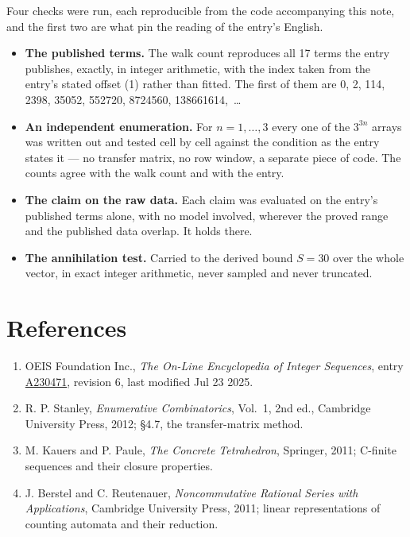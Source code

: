 \documentclass[11pt]{article}
\theoremstyle{definition}
\begin{document}
Four checks were run, each reproducible from the code accompanying this note, and the first two are what pin the reading of the entry's English.

\begin{itemize}

\item {\bfseries The published terms.} The walk count reproduces all 17 terms the entry publishes, exactly, in integer arithmetic, with the index taken from the entry's stated offset (1) rather than fitted. The first of them are 0, 2, 114, 2398, 35052, 552720, 8724560, 138661614,~\dots

\item {\bfseries An independent enumeration.} For $n = 1,\dots,3$ every one of the $3^{3n}$ arrays was written out and tested cell by cell against the condition as the entry states it --- no transfer matrix, no row window, a separate piece of code. The counts agree with the walk count and with the entry.

\item {\bfseries The claim on the raw data.} Each claim was evaluated on the entry's published terms alone, with no model involved, wherever the proved range and the published data overlap. It holds there.

\item {\bfseries The annihilation test.} Carried to the derived bound $S = 30$ over the whole vector, in exact integer arithmetic, never sampled and never truncated.

\end{itemize}

\section{References}

\begin{enumerate}

\item OEIS Foundation Inc., \emph{The On-Line Encyclopedia of Integer Sequences}, entry \href{https://oeis.org/A230471}{A230471}, revision 6, last modified Jul 23 2025.

\item R. P. Stanley, \emph{Enumerative Combinatorics}, Vol.~1, 2nd ed., Cambridge University Press, 2012; \S4.7, the transfer-matrix method.

\item M. Kauers and P. Paule, \emph{The Concrete Tetrahedron}, Springer, 2011; C-finite sequences and their closure properties.

\item J. Berstel and C. Reutenauer, \emph{Noncommutative Rational Series with Applications}, Cambridge University Press, 2011; linear representations of counting automata and their reduction.

\end{enumerate}
\end{document}
